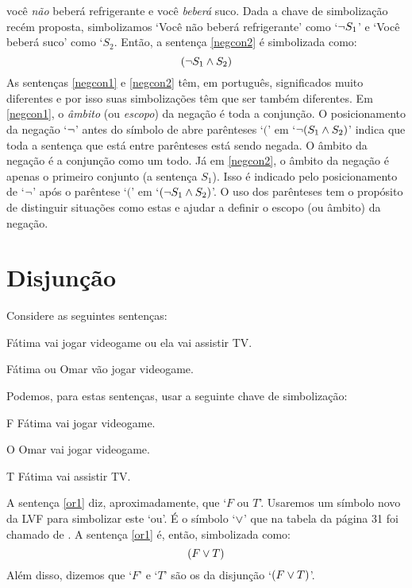 você \emph{não} beberá refrigerante e você \emph{beberá} suco.
Dada a chave de simbolização recém proposta, simbolizamos `Você não beberá refrigerante' como `$\neg S_1$' e `Você beberá suco' como `$S_2$.
Então, a sentença \ref{negcon2} é simbolizada como:
$$(\neg S_1 \wedge S_2)$$
As sentenças \ref{negcon1} e \ref{negcon2} têm, em português, significados muito diferentes e por isso suas simbolizações têm que ser também diferentes.
Em \ref{negcon1}, o \emph{âmbito} (ou \emph{escopo}) da negação é toda a conjunção.
O posicionamento da negação `$\neg$' antes do símbolo de abre parênteses `$($'  em `$\neg(S_1 \wedge S_2)$' indica que toda a sentença que está entre parênteses está sendo negada. O âmbito da negação é a conjunção como um todo.
Já em \ref{negcon2}, o âmbito da negação é apenas o primeiro conjunto (a sentença $S_1$).
Isso é indicado pelo posicionamento de `$\neg$' após o parêntese `$($' em `$(\neg S_1 \wedge S_2)$'.
O uso dos parênteses tem o propósito de distinguir situações como estas e ajudar a definir o escopo (ou âmbito) da negação.


\section{Disjunção}

Considere as seguintes sentenças:
	\begin{earg}
		\item[\ex{or1}]Fátima vai jogar videogame ou ela vai assistir TV.
		\item[\ex{or2}]Fátima ou Omar vão jogar videogame. 
	\end{earg}
Podemos, para estas sentenças, usar a seguinte chave de simbolização:
	\begin{ekey}
		\item[F] Fátima vai jogar videogame.
		\item[O] Omar vai jogar videogame.
		\item[T] Fátima vai assistir TV.
	\end{ekey}
A sentença \ref{or1} diz, aproximadamente, que `$F$ ou $T$'.
Usaremos um símbolo novo da LVF para simbolizar este `ou'.
É o símbolo `$\vee$' que na tabela da página 31 foi chamado de . 
A sentença \ref{or1} é, então, simbolizada como:
$$(F \vee T)$$
Além disso, dizemos que `$F$' e `$T$' são os  da disjunção `$(F \vee T)$'.

